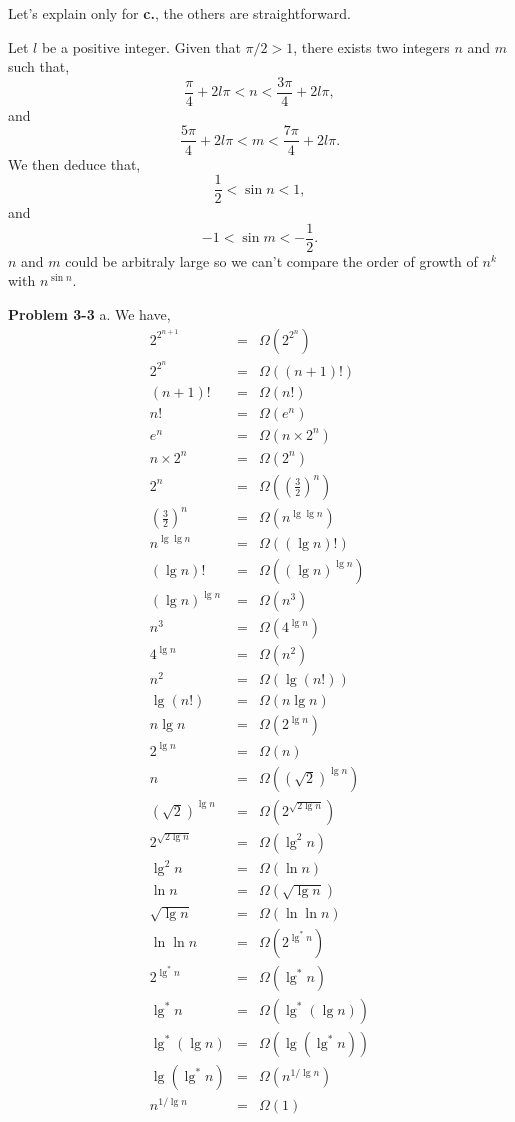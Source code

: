 \documentclass[a4paper,12pt]{article}
\newcommand{\newprob}[1]
{\bigskip \noindent \textbf{Problem #1} \newline}
\begin{document}
\medskip
Let's explain only for \textbf{c.}, the others are straightforward.

Let $l$ be a positive integer.  Given that $\pi/2 > 1$, there exists
two integers $n$ and $m$ such that,
\[ \frac{\pi}{4} + 2l\pi < n < \frac{3\pi}{4} + 2l\pi,\]
and
\[ \frac{5\pi}{4} + 2l\pi < m < \frac{7\pi}{4} + 2l\pi.\]
We then deduce that,
\[ \frac{1}{2} < \sin n < 1,\]
and
\[ -1 < \sin m < -\frac{1}{2}.\]
$n$ and $m$ could be arbitraly large so we can't compare the order of
growth of $n^k$ with $n^{\sin n}$.

\newprob{3-3}
a. We have,
\begin{eqnarray*}
2^{2^{n+1}} &=& \Omega(2^{2^n}) \\
2^{2^n} \ &=& \Omega((n+1)!)\\
(n+1)! &=& \Omega(n!) \\
n! &=& \Omega(e^n ) \\
e^n  &=& \Omega(n \times 2^n) \\
n \times 2^n &=& \Omega\left(2^n\right)\\
2^n &=& \Omega\left(\left(\frac{3}{2}\right)^n\right) \\
\left(\frac{3}{2}\right)^n &=& \Omega\left(n^{\lg \lg n}\right) \\
n^{\lg \lg n} &=& \Omega\left((\lg n)!\right) \\
(\lg n)! &=& \Omega\left((\lg n)^{\lg n}\right) \\
(\lg n)^{\lg n} &=& \Omega\left(n^3\right) \\
n^3 &=& \Omega\left(4^{\lg n}\right) \\
4^{\lg n} &=& \Omega\left(n^2\right) \\
n^2 &=& \Omega\left(\lg(n!)\right) \\
\lg(n!) &=& \Omega\left(n \lg n\right) \\
n \lg n &=& \Omega\left(2^{\lg n}\right) \\
2^{\lg n} &=& \Omega\left(n\right) \\
n &=& \Omega\left(\left(\sqrt{2}\right)^{\lg n}\right) \\
\left(\sqrt{2}\right)^{\lg n} &=& \Omega\left(2^{\sqrt{2\lg n}}\right) \\
2^{\sqrt{2\lg n}} &=& \Omega\left(\lg^2 n\right) \\
\lg^2 n &=& \Omega\left(\ln n\right) \\
\ln n &=& \Omega\left(\sqrt{\lg n}\right) \\
\sqrt{\lg n} &=& \Omega\left(\ln \ln n\right) \\
\ln \ln n &=& \Omega\left(2^{\lg^* n}\right) \\
2^{\lg^* n} &=& \Omega\left(\lg^* n\right) \\
\lg^* n &=& \Omega\left(\lg^*(\lg n)\right) \\
\lg^*(\lg n) &=& \Omega\left(\lg(\lg^* n)\right) \\
\lg(\lg^* n) &=& \Omega\left(n^{1/\lg n}\right) \\
n^{1/\lg n} &=& \Omega(1)
\end{eqnarray*}
\end{document}
